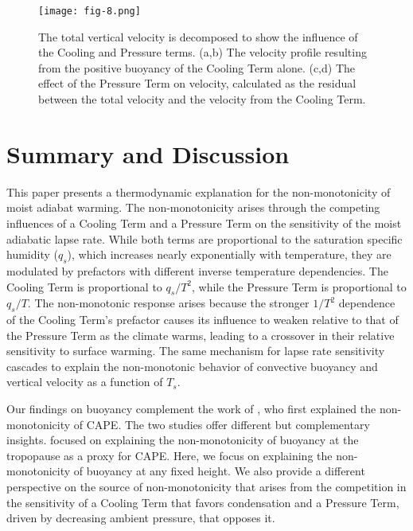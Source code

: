 \documentclass{ametsocV6.1}
\begin{document}
\clearpage

\begin{figure}[htbp]
 \centering
 \texttt{[image: fig-8.png]}\\
 \caption{The total vertical velocity is decomposed to show the influence of the Cooling and Pressure terms. (a,b) The velocity profile resulting from the positive buoyancy of the Cooling Term alone. (c,d) The effect of the Pressure Term on velocity, calculated as the residual between the total velocity and the velocity from the Cooling Term.}\label{fig:fig-8}
\end{figure}


\section{Summary and Discussion}

This paper presents a thermodynamic explanation for the non-monotonicity of moist adiabat warming. The non-monotonicity arises through the competing influences of a Cooling Term and a Pressure Term on the sensitivity of the moist adiabatic lapse rate. While both terms are proportional to the saturation specific humidity ($q_s$), which increases nearly exponentially with temperature, they are modulated by prefactors with different inverse temperature dependencies. The Cooling Term is proportional to $q_s/T^2$, while the Pressure Term is proportional to $q_s/T$. The non-monotonic response arises because the stronger $1/T^2$ dependence of the Cooling Term's prefactor causes its influence to weaken relative to that of the Pressure Term as the climate warms, leading to a crossover in their relative sensitivity to surface warming. The same mechanism for lapse rate sensitivity cascades to explain the non-monotonic behavior of convective buoyancy and vertical velocity as a function of $T_s$.

Our findings on buoyancy complement the work of \cite{romps2016}, who first explained the non-monotonicity of CAPE. The two studies offer different but complementary insights. \cite{romps2016} focused on explaining the non-monotonicity of buoyancy at the tropopause as a proxy for CAPE. Here, we focus on explaining the non-monotonicity of buoyancy at any fixed height. We also provide a different perspective on the source of non-monotonicity that arises from the competition in the sensitivity of a Cooling Term that favors condensation and a Pressure Term, driven by decreasing ambient pressure, that opposes it.
\end{document}

